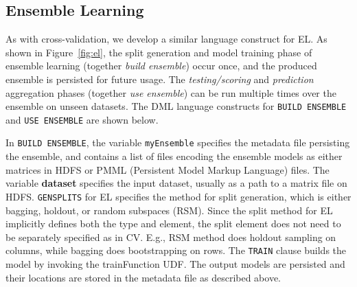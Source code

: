 \documentclass{vldb}
\begin{document}
\subsection{Ensemble Learning}
\label{sec:el-lang}

As with cross-validation, we develop a similar language construct for EL.
As shown in Figure~\ref{fig:el}, the split generation and model training phase
of ensemble learning (together \textit{build ensemble}) occur once, and the
produced ensemble is persisted for future usage.
The \textit{testing/scoring} and \textit{prediction} aggregation phases
(together \textit{use ensemble}) can be run multiple times over the ensemble
on unseen datasets. The DML language constructs for {\tt BUILD ENSEMBLE}
and {\tt USE ENSEMBLE} are shown below. \\

\begin{center}
\end{center}

In {\tt BUILD ENSEMBLE}, the variable {\tt myEnsemble} specifies the
metadata file persisting the ensemble, and contains a list of files
encoding the ensemble models as either matrices in HDFS or PMML
(Persistent Model Markup Language) files.
The variable \textbf{dataset} specifies the input dataset,
usually as a path to a matrix file on HDFS. {\tt GENSPLITS} for EL specifies the method for split generation, which is either bagging, holdout, or random subspaces (RSM). Since the split method for EL implicitly defines both the type and
element, the split element does not need to be separately specified as in CV.
E.g., RSM method does holdout sampling on columns, while bagging does bootstrapping on rows.
The {\tt TRAIN} clause builds the model by invoking the trainFunction UDF.
The output models are persisted and their locations are stored in the metadata file as described above.
\end{document}
